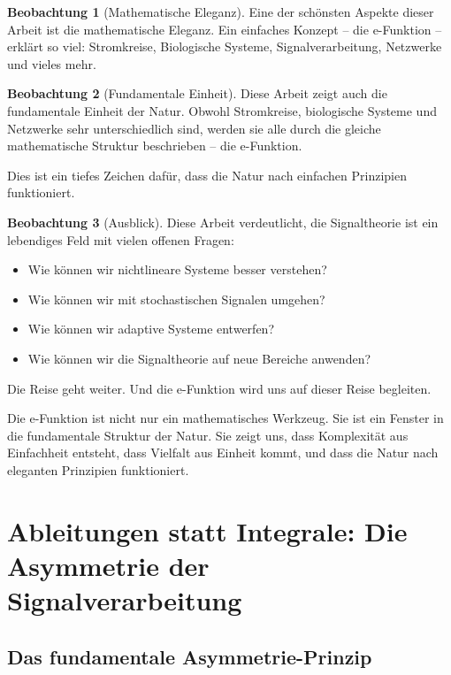 ﻿\documentclass[a4paper,12pt]{report}
\theoremstyle{definition}
\newtheorem{beobachtung}{Beobachtung}
\begin{document}
	\begin{beobachtung}[Mathematische Eleganz]
		Eine der schönsten Aspekte dieser Arbeit ist die mathematische Eleganz. Ein einfaches Konzept -- die e-Funktion -- erklärt so viel: Stromkreise, Biologische Systeme, Signalverarbeitung, Netzwerke und vieles mehr.
	\end{beobachtung}
	
	\begin{beobachtung}[Fundamentale Einheit]
		Diese Arbeit zeigt auch die fundamentale Einheit der Natur. Obwohl Stromkreise, biologische Systeme und Netzwerke sehr unterschiedlich sind, werden sie alle durch die gleiche mathematische Struktur beschrieben -- die e-Funktion.
		
		Dies ist ein tiefes Zeichen dafür, dass die Natur nach einfachen Prinzipien funktioniert.
	\end{beobachtung}
	
	\begin{beobachtung}[Ausblick]
		Diese Arbeit verdeutlicht, die Signaltheorie ist ein lebendiges Feld mit vielen offenen Fragen:
		\begin{itemize}
			\item[-] Wie können wir nichtlineare Systeme besser verstehen?
			\item[-] Wie können wir mit stochastischen Signalen umgehen?
			\item[-] Wie können wir adaptive Systeme entwerfen?
			\item[-] Wie können wir die Signaltheorie auf neue Bereiche anwenden?
		\end{itemize}
		
		Die Reise geht weiter. Und die e-Funktion wird uns auf dieser Reise begleiten.
	\end{beobachtung}
	
	Die e-Funktion ist nicht nur ein mathematisches Werkzeug. Sie ist ein Fenster in die fundamentale Struktur der Natur. Sie zeigt uns, dass Komplexität aus Einfachheit entsteht, dass Vielfalt aus Einheit kommt, und dass die Natur nach eleganten Prinzipien funktioniert.
	
	\chapter{Ableitungen statt Integrale: Die Asymmetrie der Signalverarbeitung}
	
	\section{Das fundamentale Asymmetrie-Prinzip}
	
\end{document}

